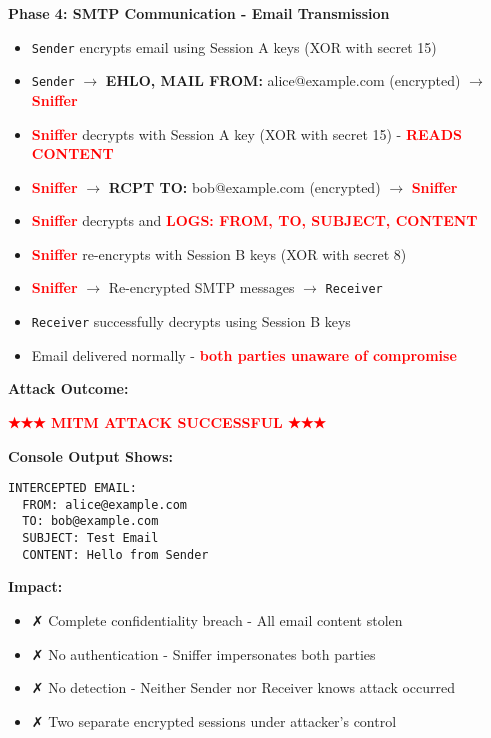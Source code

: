 \documentclass[a4paper,12pt]{extarticle}
\begin{document}
\vspace{0.3cm}
\textbf{Phase 4: SMTP Communication - Email Transmission}
\begin{itemize}[leftmargin=1cm]
    \item \texttt{Sender} encrypts email using Session A keys (XOR with secret 15)
    \item \texttt{Sender} $\rightarrow$ \textcolor{maincolor}{\textbf{EHLO, MAIL FROM:} alice@example.com} (encrypted) $\rightarrow$ \textcolor{red}{\textbf{Sniffer}}
    \item \textcolor{red}{\textbf{Sniffer}} decrypts with Session A key (XOR with secret 15) - \textcolor{red}{\textbf{READS CONTENT}}
    \item \textcolor{red}{\textbf{Sniffer}} $\rightarrow$ \textcolor{maincolor}{\textbf{RCPT TO:} bob@example.com} (encrypted) $\rightarrow$ \textcolor{red}{\textbf{Sniffer}}
    \item \textcolor{red}{\textbf{Sniffer}} decrypts and \textcolor{red}{\textbf{LOGS: FROM, TO, SUBJECT, CONTENT}}
    \item \textcolor{red}{\textbf{Sniffer}} re-encrypts with Session B keys (XOR with secret 8)
    \item \textcolor{red}{\textbf{Sniffer}} $\rightarrow$ \textcolor{maincolor}{Re-encrypted SMTP messages} $\rightarrow$ \texttt{Receiver}
    \item \texttt{Receiver} successfully decrypts using Session B keys
    \item Email delivered normally - \textcolor{red}{\textbf{both parties unaware of compromise}}
\end{itemize}

\vspace{0.3cm}
\textbf{Attack Outcome:}
\begin{successbox}
\textcolor{red}{\textbf{★★★ MITM ATTACK SUCCESSFUL ★★★}}

\textbf{Console Output Shows:}
\begin{verbatim}
INTERCEPTED EMAIL:
  FROM: alice@example.com
  TO: bob@example.com
  SUBJECT: Test Email
  CONTENT: Hello from Sender
\end{verbatim}

\textbf{Impact:}
\begin{itemize}
    \item ✗ Complete confidentiality breach - All email content stolen
    \item ✗ No authentication - Sniffer impersonates both parties
    \item ✗ No detection - Neither Sender nor Receiver knows attack occurred
    \item ✗ Two separate encrypted sessions under attacker's control
\end{itemize}
\end{successbox}
\end{document}
